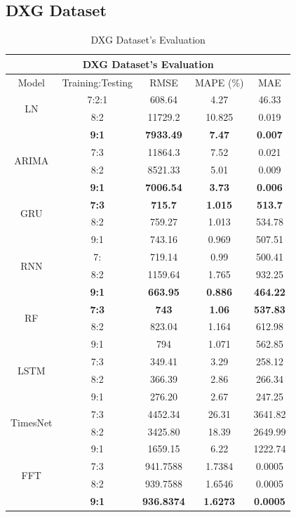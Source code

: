 \documentclass{ieeeojies}
\begin{document}
\subsection{DXG Dataset} 
\begin{table}[H]
  \centering
  \begin{tabular}{|c|c|c|c|c|}
         \hline
         \multicolumn{5}{|c|}{\textbf{DXG Dataset's Evaluation}}\\
         \hline
         \centering Model & Training:Testing & RMSE & MAPE (\%) & MAE\\
         \hline
         \multirow{2}{*}{LN} & 7:2:1 & 608.64 & 4.27 & 46.33 \\ & 8:2 & 11729.2 & 10.825 & 0.019 \\ & \textbf{9:1} & \textbf{7933.49} & \textbf{7.47} & \textbf{0.007}\\
         \hline
         \multirow{2}{*}{ARIMA} & 7:3&11864.3&7.52&0.021\\ & 8:2&8521.33&5.01&0.009 \\ & \textbf{9:1} & \textbf{7006.54} & \textbf{3.73} & \textbf{0.006}\\
         \hline
         \multirow{2}{*}{GRU} & \textbf{7:3}& \textbf{715.7} & \textbf{1.015} & \textbf{513.7} \\ & 8:2 & 759.27 & 1.013 & 534.78  \\ & 9:1 & 743.16	&0.969&507.51\\
         \hline
         \multirow{2}{*}{RNN} & 7: &  719.14 &  0.99 &  500.41 \\ & 8:2 &  1159.64 & 1.765 &  932.25 \\ & \textbf{9:1} & \textbf{663.95} & \textbf{0.886} & \textbf{464.22} \\
         \hline
         \multirow{2}{*}{RF} & \textbf{7:3}	& \textbf{743} & \textbf{1.06} &  \textbf{537.83} \\ & 8:2 & 823.04 & 1.164 & 612.98 \\ & 9:1 & 794 & 1.071 & 562.85\\
         \hline
         \multirow{2}{*}{LSTM} & 7:3 & 349.41 & 3.29 & 258.12 \\ & 8:2 & 366.39 & 2.86 & 266.34 \\ & 9:1 & 276.20	&2.67&247.25\\
         \hline
         \multirow{2}{*}{TimesNet} & 7:3 & 4452.34 & 26.31 & 3641.82 \\ & 8:2 & 3425.80 & 18.39 & 2649.99 \\ & 9:1 & 1659.15	& 6.22 &1222.74\\
         \hline
         \multirow{2}{*}{FFT} & 7:3 & 941.7588 &  1.7384 &  0.0005 \\ & 8:2 & 939.7588 &  1.6546 &  0.0005 \\ & \textbf{9:1} & \textbf{936.8374} & \textbf{1.6273} & \textbf{0.0005}\\
         \hline
    \end{tabular}
    \caption{DXG Dataset's Evaluation}

    \label{vcbresult}
\end{table}
\end{document}
